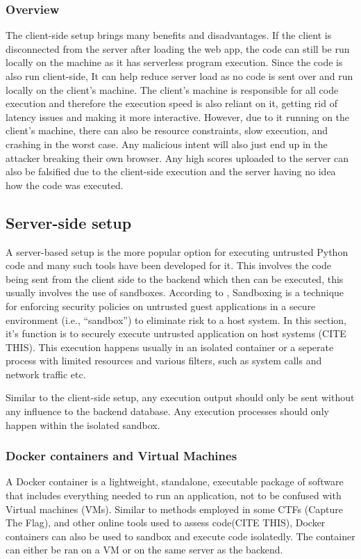 \subsubsection{Overview}
The client-side setup brings many benefits and disadvantages. If the client is disconnected from the server after loading the web app, the code can still be run locally on the machine as it has serverless program execution. Since the code is also run client-side, It can help reduce server load as no code is sent over and run locally on the client's machine. The client's machine is responsible for all code execution and therefore the execution speed is also reliant on it, getting rid of latency issues and making it more interactive. However, due to it running on the client's machine, there can also be resource constraints, slow execution, and crashing in the worst case. Any malicious intent will also just end up in the attacker breaking their own browser. Any high scores uploaded to the server can also be falsified due to the client-side execution and the server having no idea how the code was executed.

\subsection{Server-side setup}
A server-based setup is the more popular option for executing untrusted Python code and many such tools have been developed for it. This involves the code being sent from the client side to the backend which then can be executed, this usually involves the use of sandboxes. According to \cite{stephens2024sandbox}, Sandboxing is a technique for enforcing security policies on untrusted guest applications in a secure environment (i.e., “sandbox”) to eliminate risk to a host system. In this section, it's function is to securely execute untrusted application on host systems (CITE THIS). This execution happens usually in an isolated container or a seperate process with limited resources and various filters, such as system calls and network traffic etc.

Similar to the client-side setup, any execution output should only be sent without any influence to the backend database. Any execution processes should only happen within the isolated sandbox.

\subsubsection{Docker containers and Virtual Machines}
A Docker container is a lightweight, standalone, executable package of software that includes everything needed to run an application, not to be confused with Virtual machines (VMs). Similar to methods employed in some CTFs (Capture The Flag), and other online tools used to assess code(CITE THIS), Docker containers can also be used to sandbox and execute code isolatedly. The container can either be ran on a VM or on the same server as the backend.

